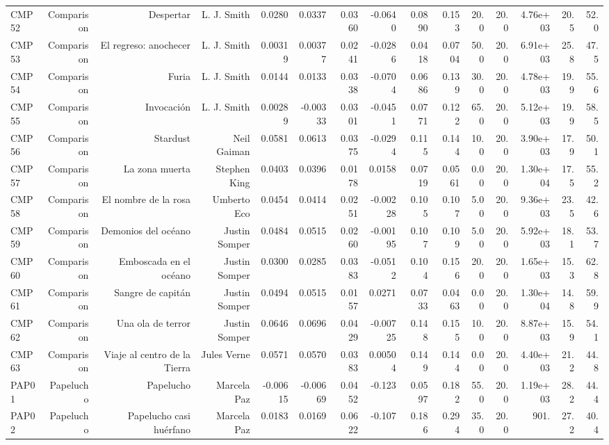 \begin{table}[htbp]
\begin{tabular}{lrrrrrrrrrrrrrr}
CMP52 & Comparison & Despertar & L. J. Smith & 0.0280 & 0.0337 & 0.0360 & -0.0640 & 0.0890 & 0.153 & 20.0 & 20.0 & 4.76e+03 & 20.5 & 52.0 \\
CMP53 & Comparison & El regreso: anochecer & L. J. Smith & 0.00319 & 0.00377 & 0.0241 & -0.0286 & 0.0418 & 0.0704 & 50.0 & 20.0 & 6.91e+03 & 25.8 & 47.5 \\
CMP54 & Comparison & Furia & L. J. Smith & 0.0144 & 0.0133 & 0.0338 & -0.0704 & 0.0686 & 0.139 & 30.0 & 20.0 & 4.78e+03 & 19.9 & 55.6 \\
CMP55 & Comparison & Invocación & L. J. Smith & 0.00289 & -0.00333 & 0.0301 & -0.0451 & 0.0771 & 0.122 & 65.0 & 20.0 & 5.12e+03 & 19.9 & 58.5 \\
CMP56 & Comparison & Stardust & Neil Gaiman & 0.0581 & 0.0613 & 0.0375 & -0.0294 & 0.115 & 0.144 & 10.0 & 20.0 & 3.90e+03 & 17.9 & 50.1 \\
CMP57 & Comparison & La zona muerta & Stephen King & 0.0403 & 0.0396 & 0.0178 & 0.0158 & 0.0719 & 0.0561 & 0.00 & 20.0 & 1.30e+04 & 17.5 & 55.2 \\
CMP58 & Comparison & El nombre de la rosa & Umberto Eco & 0.0454 & 0.0414 & 0.0251 & -0.00228 & 0.105 & 0.107 & 5.00 & 20.0 & 9.36e+03 & 23.5 & 42.6 \\
CMP59 & Comparison & Demonios del océano & Justin Somper & 0.0484 & 0.0515 & 0.0260 & -0.00195 & 0.107 & 0.109 & 5.00 & 20.0 & 5.92e+03 & 18.1 & 53.7 \\
CMP60 & Comparison & Emboscada en el océano & Justin Somper & 0.0300 & 0.0285 & 0.0383 & -0.0512 & 0.104 & 0.156 & 20.0 & 20.0 & 1.65e+03 & 15.3 & 62.8 \\
CMP61 & Comparison & Sangre de capitán & Justin Somper & 0.0494 & 0.0515 & 0.0157 & 0.0271 & 0.0733 & 0.0463 & 0.00 & 20.0 & 1.30e+04 & 14.8 & 59.9 \\
CMP62 & Comparison & Una ola de terror & Justin Somper & 0.0646 & 0.0696 & 0.0429 & -0.00725 & 0.148 & 0.155 & 10.0 & 20.0 & 8.87e+03 & 15.9 & 54.1 \\
CMP63 & Comparison & Viaje al centro de la Tierra & Jules Verne & 0.0571 & 0.0570 & 0.0383 & 0.00504 & 0.149 & 0.144 & 0.00 & 20.0 & 4.40e+03 & 21.2 & 44.8 \\
PAP01 & Papelucho & Papelucho & Marcela Paz & -0.00615 & -0.00669 & 0.0452 & -0.123 & 0.0597 & 0.182 & 55.0 & 20.0 & 1.19e+03 & 28.2 & 44.4 \\
PAP02 & Papelucho & Papelucho casi huérfano & Marcela Paz & 0.0183 & 0.0169 & 0.0622 & -0.107 & 0.186 & 0.294 & 35.0 & 20.0 & 901. & 27.2 & 40.4 \\

\end{tabular}
\end{table}
